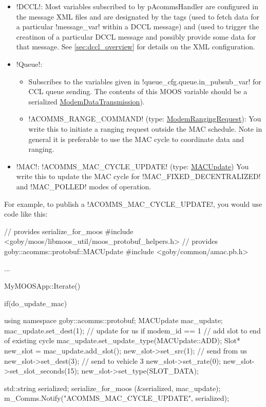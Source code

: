 \begin{itemize}
\item !DCCL!: Most variables subscribed to by pAcommsHandler are configured in the message XML files and are designated by the tags  (used to fetch data for a particular !message_var! within a DCCL message) and  (used to trigger the creatinon of a particular DCCL message and possibly provide some data for that message. See \ref{sec:dccl_overview} for details on the XML configuration. 
\item !Queue!:
\begin{itemize}
\item Subscribes to the variables given in !queue_cfg.queue.in_pubsub_var! for CCL queue sending. The contents of this MOOS variable should be a serialized \href{http://gobysoft.com/doc/modem__message_8proto_source.html}{ModemDataTransmission}). 
\item !ACOMMS_RANGE_COMMAND! (type: \href{http://gobysoft.com/doc/modem__message_8proto_source.html}{ModemRangingRequest}): You write this to initiate a ranging request outside the MAC schedule. Note in general it is preferable to use the MAC cycle to coordinate data and ranging.
\end{itemize}
\item !MAC!: !ACOMMS_MAC_CYCLE_UPDATE! (type: \href{http://gobysoft.com/doc/amac_8proto_source.html}{MACUpdate}) You write this to update the MAC cycle for !MAC_FIXED_DECENTRALIZED! and !MAC_POLLED! modes of operation.
\end{itemize}

For example, to publish a !ACOMMS_MAC_CYCLE_UPDATE!, you would use code like this:
\begin{boxedverbatim}
// provides serialize_for_moos
#include <goby/moos/libmoos_util/moos_protobuf_helpers.h>
// provides goby::acomms::protobuf::MACUpdate
#include <goby/common/amac.pb.h>

...

MyMOOSApp::Iterate()
{
  if(do_update_mac)
  { 
    using namespace goby::acomms::protobuf;
    MACUpdate mac_update;
    mac_update.set_dest(1); // update for us if modem_id == 1
    // add slot to end of existing cycle
    mac_update.set_update_type(MACUpdate::ADD);
    Slot* new_slot = mac_update.add_slot();
    new_slot->set_src(1);  // send from us
    new_slot->set_dest(3); // send to vehicle 3
    new_slot->set_rate(0);
    new_slot->set_slot_seconds(15);
    new_slot->set_type(SLOT_DATA);
    
    std::string serialized;
    serialize_for_moos (&serialized, mac_update);
    m_Comms.Notify("ACOMMS_MAC_CYCLE_UPDATE", serialized);
  }
}
\end{boxedverbatim}
\resetbvlinenumber

